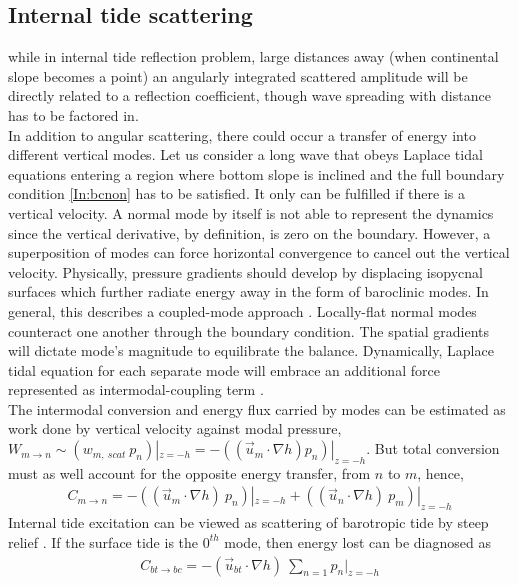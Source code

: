 \documentclass[12pt]{article}
\begin{document}
\subsection{Internal tide scattering}
 while in internal tide reflection problem, large distances away (when 
 continental slope becomes a point) an angularly integrated scattered amplitude will be directly 
 related to a reflection coefficient, though wave spreading with distance has to be factored in.\\
In addition to angular scattering, there could occur a transfer of energy into different vertical 
modes. Let us consider a long wave that obeys Laplace tidal equations entering a region where 
bottom slope is inclined and the full boundary condition \eqref{In:bcnon} has to be satisfied. It 
only can be fulfilled if there is a vertical velocity. A normal mode by itself is not able to 
represent the dynamics since the vertical derivative, by definition, is zero on the boundary. 
However, a superposition of modes can force horizontal convergence to cancel out the vertical 
velocity. Physically, pressure gradients should develop by displacing isopycnal surfaces which 
further radiate energy away in the form of baroclinic modes. In general, this describes a 
coupled-mode approach \citep{griffiths2007internal}. Locally-flat normal modes counteract one 
another through the boundary condition. The spatial gradients will dictate mode's magnitude to 
equilibrate the balance. Dynamically, Laplace tidal equation for each separate mode will embrace an 
additional force represented as intermodal-coupling term \citep{griffiths2007internal, 
kelly2016coupled}.\\
The intermodal conversion and energy flux carried by modes can be estimated as work done by 
vertical velocity against modal pressure, $W_{m \to n} \sim (w_{m,~scat}~p_n)|_{z = 
-h} = -((\vec{u}_m \cdot \nabla h) p_n)|_{z = -h}$. But total conversion must as well account for 
the opposite energy transfer, from $n$ to $m$, hence,
\begin{align}
\label{In:en.trans}
C_{m \to n} = -((\vec{u}_m \cdot \nabla h)~p_n)|_{z = -h} + ((\vec{u}_n \cdot \nabla h)~p_m)|_{z = 
-h}
\end{align}
Internal tide excitation can be viewed as scattering of barotropic tide by steep relief 
\citep{hendershott1981long}. If the surface tide is the $0^{th}$ mode, then energy lost can be 
diagnosed as
\begin{align}
\label{In:bt_bc}
C_{bt \to bc} = -(\vec{u}_{bt} \cdot \nabla h)~\sum_{n = 1} p_n|_{z = -h}
\end{align}
\end{document}
